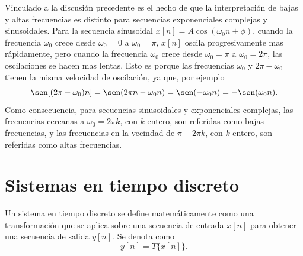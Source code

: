 \documentclass[a4paper]{report}
\begin{document}
\begin{itemize}
 Vinculado a la discusión precedente es el hecho de que la interpretación de bajas y altas frecuencias es distinto para secuencias exponenciales complejas y sinusoidales. Para la secuencia sinusoidal \(x[n]=A\cos(\omega_0n+\phi)\), cuando la frecuencia \(\omega_0\) crece desde \(\omega_0=0\) a \(\omega_0=\pi\), \(x[n]\) oscila progresivamente mas rápidamente, pero cuando la frecuencia \(\omega_0\) crece desde \(\omega_0=\pi\) a \(\omega_0=2\pi\), las oscilaciones se hacen mas lentas. Esto es porque las frecuencias \(\omega_0\) y \(2\pi-\omega_0\) tienen la misma velocidad de oscilación, ya que, por ejemplo
 \[
  \sen[(2\pi-\omega_0)n]=\sen(2\pi n-\omega_0n)=\sen(-\omega_0n)=-\sen(\omega_0n).
 \]
 Como consecuencia, para secuencias sinusoidales y exponenciales complejas, las frecuencias cercanas a \(\omega_0=2\pi k\), con \(k\) entero, son referidas como bajas frecuencias, y las frecuencias en la vecindad de \(\pi+2\pi k\), con \(k\) entero, son referidas como altas frecuencias.
\end{itemize} 
 
\section{Sistemas en tiempo discreto}

Un sistema en tiempo discreto se define matemáticamente como una transformación que se aplica sobre una secuencia de entrada \(x[n]\) para obtener una secuencia de salida \(y[n]\). Se denota como
\[
 y[n]=T\{x[n]\}.
\]
\end{document}
